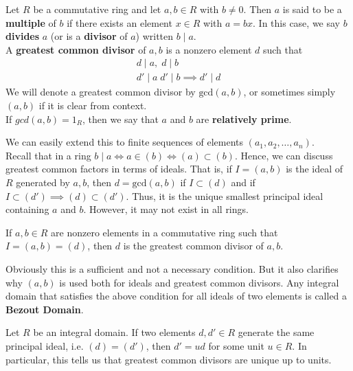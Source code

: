 \documentclass{memoir}
\begin{document}
\begin{defn}
	Let \(R\) be a commutative ring and let \(a,b \in R\) with \(b\neq 0\). Then \(a\) is said to be a \textbf{multiple} of \(b\) if there exists an element \(x \in R\) with \(a=bx\). In this case, we say \(b\) \textbf{divides} \(a\) (or is a \textbf{divisor} of \(a \)) written \(b\mid a\).\\

	A \textbf{greatest common divisor} of \(a,b\) is a nonzero element \(d\) such that
	\begin{align*}
		d \mid a, \; d \mid b \\
		d'\mid a \; d'\mid b \implies d'\mid d
	\end{align*}
	We will denote a greatest common divisor by \(\textrm{gcd}(a,b)\), or sometimes simply \((a,b)\) if it is clear from context.\\

	If \(gcd(a,b) = 1_R\), then we say that \(a\) and \(b\) are \textbf{relatively prime}.
\end{defn}
We can easily extend this to finite sequences of elements \((a_1,a_2,\ldots,a_n)\).\\

Recall that in a ring \(b\mid a \iff a \in (b) \iff (a) \subset (b)\). Hence, we can discuss greatest common factors in terms of ideals. That is, if \(I = (a,b)\) is the ideal of \(R\) generated by \(a,b\), then \(d = \textrm{gcd}(a,b)\) if \(I\subset (d)\) and if \(I\subset (d') \implies (d)\subset (d')\). Thus, it is the unique smallest principal ideal containing \(a\) and \(b\). However, it may not exist in all rings.

\begin{prop}
	If \(a,b \in R\) are nonzero elements in a commutative ring such that \(I = (a,b) = (d)\), then \(d\) is the greatest common divisor of \(a,b\).
\end{prop}
Obviously this is a sufficient and not a necessary condition. But it also clarifies why \((a,b)\) is used both for ideals and greatest common divisors. Any integral domain that satisfies the above condition for all ideals of two elements is called a \textbf{Bezout Domain}.

\begin{prop}
	Let \(R\) be an integral domain. If two elements \(d,d' \in R\) generate the same principal ideal, i.e. \((d) = (d')\), then \(d' = ud\) for some unit \(u \in R\). In particular, this tells us that greatest common divisors are unique up to units.
\end{prop}
\end{document}
